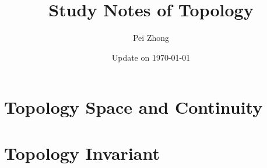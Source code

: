 \documentclass[12pt,oneside]{book} %
\begin{document}
\title{\bf \huge Study Notes of Topology}
\author{Pei Zhong}
\date{Update on \today}

\maketitle


\tableofcontents

\begin{spacing}{1}












\part{Topology Space and Continuity}




\part{Topology Invariant}








\part{}








\end{spacing}
\end{document}
